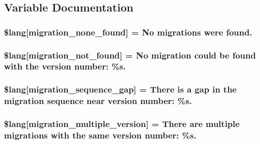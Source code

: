 \subsection{Variable Documentation}
\hypertarget{migration__lang_8php_affa6337f0973de810b3c61491deae6b1}{}
\subsubsection[{\$lang}]{\setlength{\rightskip}{0pt plus 5cm}\$lang\mbox{[}\textquotesingle{}migration\+\_\+none\+\_\+found\textquotesingle{}\mbox{]} = \textquotesingle{}No migrations were found.\textquotesingle{}}\label{migration__lang_8php_affa6337f0973de810b3c61491deae6b1}
\hypertarget{migration__lang_8php_a92dd777422d70950993d43f4d0c31b1b}{}
\subsubsection[{\$lang}]{\setlength{\rightskip}{0pt plus 5cm}\$lang\mbox{[}\textquotesingle{}migration\+\_\+not\+\_\+found\textquotesingle{}\mbox{]} = \textquotesingle{}No migration could be found with the {\bf version} number\+: \%s.\textquotesingle{}}\label{migration__lang_8php_a92dd777422d70950993d43f4d0c31b1b}
\hypertarget{migration__lang_8php_ab1f43d98bc1365f4b753d783a8802697}{}
\subsubsection[{\$lang}]{\setlength{\rightskip}{0pt plus 5cm}\$lang\mbox{[}\textquotesingle{}migration\+\_\+sequence\+\_\+gap\textquotesingle{}\mbox{]} = \textquotesingle{}There is {\bf a} gap in the migration sequence near {\bf version} number\+: \%s.\textquotesingle{}}\label{migration__lang_8php_ab1f43d98bc1365f4b753d783a8802697}
\hypertarget{migration__lang_8php_a1a98130d04f280e6a5f6f509179f9e01}{}
\subsubsection[{\$lang}]{\setlength{\rightskip}{0pt plus 5cm}\$lang\mbox{[}\textquotesingle{}migration\+\_\+multiple\+\_\+version\textquotesingle{}\mbox{]} = \textquotesingle{}There are multiple migrations with the same {\bf version} number\+: \%s.\textquotesingle{}}\label{migration__lang_8php_a1a98130d04f280e6a5f6f509179f9e01}
\hypertarget{migration__lang_8php_a141dceda5b8294f6e4ddf7e5da6fe71d}{}
